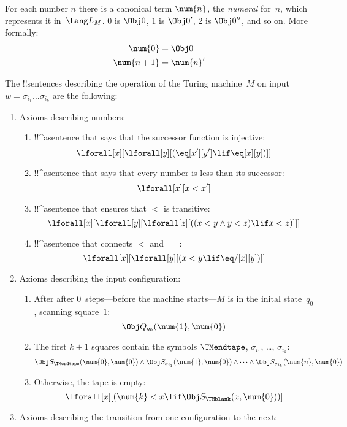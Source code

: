 \documentclass[../../../include/open-logic-section]{subfiles}
\begin{document}
For each number $n$ there is a canonical term $\num{n}$, the
\emph{numeral} for~$n$, which represents it in~$\Lang L_M$. $\num{0}$
is $\Obj 0$, $\num{1}$ is $\Obj 0'$, $\num{2}$ is $\Obj 0''$, and so
on. More formally:
\begin{align*}
\num{0} & = \Obj 0 \\
\num{n+1} &= \num{n}'
\end{align*}

The !!{sentence}s describing the operation of the Turing machine~$M$ on
input $w = \sigma_{i_1}\dots\sigma_{i_k}$ are the following:
\begin{enumerate}
\item Axioms describing numbers:
\begin{enumerate}
\item {} !!^a{sentence} that says that the successor function is injective:
\[
\lforall[x][\lforall[y][
    (\eq[x'][y'] \lif \eq[x][y])]]
\]
\item !!^a{sentence} that says that every number is less than its successor:
\[
\lforall[x][x < x']
\]
\item !!^a{sentence} that ensures that $<$ is transitive:
\[
\lforall[x][\lforall[y][\lforall[z][
      ((x < y \land y < z) \lif x < z)]]]
\]
\item !!^a{sentence} that connects $<$ and~$=$:
\[
\lforall[x][\lforall[y][(x < y \lif \eq/[x][y])]]
\]
\end{enumerate}
\item Axioms describing the input configuration:
\begin{enumerate}
\item After after $0$~steps---before the machine starts---$M$ is in
  the inital state~$q_0$, scanning square~$1$:
\[
\Obj Q_{q_0}(\num{1}, \num{0})
\]
\item The first $k+1$ squares contain the symbols $\TMendtape$,
  $\sigma_{i_1}$, \dots, $\sigma_{i_k}$:
\[
\Obj S_\TMendtape(\num{0}, \num{0}) \land
\Obj S_{\sigma_{i_1}}(\num{1}, \num{0}) \land
\dots \land
\Obj S_{\sigma_{i_k}}(\num{n}, \num{0})
\]
\item Otherwise, the tape is empty:
\[
\lforall[x][(\num{k} < x \lif \Obj S_\TMblank(x, \num{0}))]
\]
\end{enumerate}
\item Axioms describing the transition from one configuration to
  the next:


\end{enumerate}
\end{document}

